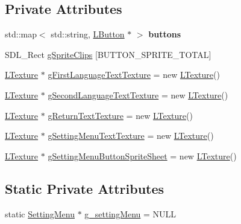 \subsection*{Private Attributes}
\begin{DoxyCompactItemize}
\item 
\mbox{\label{class_setting_menu_a8251aef23f9799cf380b5ba535cc51fd}} 
std\+::map$<$ std\+::string, \mbox{\hyperlink{class_l_button}{L\+Button}} $\ast$ $>$ {\bfseries buttons}
\item 
S\+D\+L\+\_\+\+Rect \mbox{\hyperlink{class_setting_menu_ab195bf7620da5060ef399757bd68dfe1}{g\+Sprite\+Clips}} \mbox{[}B\+U\+T\+T\+O\+N\+\_\+\+S\+P\+R\+I\+T\+E\+\_\+\+T\+O\+T\+AL\mbox{]}
\item 
\mbox{\hyperlink{class_l_texture}{L\+Texture}} $\ast$ \mbox{\hyperlink{class_setting_menu_a5a749d9f59f41edca75ed98cb7babf67}{g\+First\+Language\+Text\+Texture}} = new \mbox{\hyperlink{class_l_texture}{L\+Texture}}()
\item 
\mbox{\hyperlink{class_l_texture}{L\+Texture}} $\ast$ \mbox{\hyperlink{class_setting_menu_a19fd74870b4a6120dec613dd34cb8efa}{g\+Second\+Language\+Text\+Texture}} = new \mbox{\hyperlink{class_l_texture}{L\+Texture}}()
\item 
\mbox{\hyperlink{class_l_texture}{L\+Texture}} $\ast$ \mbox{\hyperlink{class_setting_menu_a3a11c6b43a94fe2490b19e50fd0ae44e}{g\+Return\+Text\+Texture}} = new \mbox{\hyperlink{class_l_texture}{L\+Texture}}()
\item 
\mbox{\hyperlink{class_l_texture}{L\+Texture}} $\ast$ \mbox{\hyperlink{class_setting_menu_aae85c23f501347d1bfa5570f150a93d6}{g\+Setting\+Menu\+Text\+Texture}} = new \mbox{\hyperlink{class_l_texture}{L\+Texture}}()
\item 
\mbox{\hyperlink{class_l_texture}{L\+Texture}} $\ast$ \mbox{\hyperlink{class_setting_menu_a739a40d912336a5939825c0ac34f1c00}{g\+Setting\+Menu\+Button\+Sprite\+Sheet}} = new \mbox{\hyperlink{class_l_texture}{L\+Texture}}()
\end{DoxyCompactItemize}
\subsection*{Static Private Attributes}
\begin{DoxyCompactItemize}
\item 
static \mbox{\hyperlink{class_setting_menu}{Setting\+Menu}} $\ast$ \mbox{\hyperlink{class_setting_menu_aebfc5fb62c847d2a5f042bdc422ed23f}{g\+\_\+setting\+Menu}} = N\+U\+LL
\end{DoxyCompactItemize}


